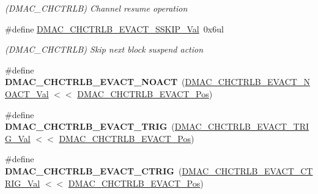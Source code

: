 \begin{DoxyCompactItemize}
\begin{DoxyCompactList}\small\item\em (D\+M\+A\+C\+\_\+\+C\+H\+C\+T\+R\+L\+B) Channel resume operation \end{DoxyCompactList}\item 
\hypertarget{group___s_a_m_l21___d_m_a_c_ga30fe7c169fb72d0ba2f073769858069a}{}\#define \hyperlink{group___s_a_m_l21___d_m_a_c_ga30fe7c169fb72d0ba2f073769858069a}{D\+M\+A\+C\+\_\+\+C\+H\+C\+T\+R\+L\+B\+\_\+\+E\+V\+A\+C\+T\+\_\+\+S\+S\+K\+I\+P\+\_\+\+Val}~0x6ul\label{group___s_a_m_l21___d_m_a_c_ga30fe7c169fb72d0ba2f073769858069a}

\begin{DoxyCompactList}\small\item\em (D\+M\+A\+C\+\_\+\+C\+H\+C\+T\+R\+L\+B) Skip next block suspend action \end{DoxyCompactList}\item 
\hypertarget{group___s_a_m_l21___d_m_a_c_ga71d77ee941fa3622ab00c73f71846f65}{}\#define {\bfseries D\+M\+A\+C\+\_\+\+C\+H\+C\+T\+R\+L\+B\+\_\+\+E\+V\+A\+C\+T\+\_\+\+N\+O\+A\+C\+T}~(\hyperlink{group___s_a_m_l21___d_m_a_c_ga0a82857cf374c8eb7754e671c886dcac}{D\+M\+A\+C\+\_\+\+C\+H\+C\+T\+R\+L\+B\+\_\+\+E\+V\+A\+C\+T\+\_\+\+N\+O\+A\+C\+T\+\_\+\+Val}  $<$$<$ \hyperlink{group___s_a_m_l21___d_m_a_c_ga5d582eee4f8e2bfd97709b103da6830e}{D\+M\+A\+C\+\_\+\+C\+H\+C\+T\+R\+L\+B\+\_\+\+E\+V\+A\+C\+T\+\_\+\+Pos})\label{group___s_a_m_l21___d_m_a_c_ga71d77ee941fa3622ab00c73f71846f65}

\item 
\hypertarget{group___s_a_m_l21___d_m_a_c_gad57584fbe4da10d355cdea4acc6cfec6}{}\#define {\bfseries D\+M\+A\+C\+\_\+\+C\+H\+C\+T\+R\+L\+B\+\_\+\+E\+V\+A\+C\+T\+\_\+\+T\+R\+I\+G}~(\hyperlink{group___s_a_m_l21___d_m_a_c_ga069ed2b2546fdd8706fe1eedcb1674d2}{D\+M\+A\+C\+\_\+\+C\+H\+C\+T\+R\+L\+B\+\_\+\+E\+V\+A\+C\+T\+\_\+\+T\+R\+I\+G\+\_\+\+Val}   $<$$<$ \hyperlink{group___s_a_m_l21___d_m_a_c_ga5d582eee4f8e2bfd97709b103da6830e}{D\+M\+A\+C\+\_\+\+C\+H\+C\+T\+R\+L\+B\+\_\+\+E\+V\+A\+C\+T\+\_\+\+Pos})\label{group___s_a_m_l21___d_m_a_c_gad57584fbe4da10d355cdea4acc6cfec6}

\item 
\hypertarget{group___s_a_m_l21___d_m_a_c_ga13f2fdfac3a5fd93284fcf317ae90e6b}{}\#define {\bfseries D\+M\+A\+C\+\_\+\+C\+H\+C\+T\+R\+L\+B\+\_\+\+E\+V\+A\+C\+T\+\_\+\+C\+T\+R\+I\+G}~(\hyperlink{group___s_a_m_l21___d_m_a_c_ga4cf090f0ab1ac7d1231fb79627925227}{D\+M\+A\+C\+\_\+\+C\+H\+C\+T\+R\+L\+B\+\_\+\+E\+V\+A\+C\+T\+\_\+\+C\+T\+R\+I\+G\+\_\+\+Val}  $<$$<$ \hyperlink{group___s_a_m_l21___d_m_a_c_ga5d582eee4f8e2bfd97709b103da6830e}{D\+M\+A\+C\+\_\+\+C\+H\+C\+T\+R\+L\+B\+\_\+\+E\+V\+A\+C\+T\+\_\+\+Pos})\label{group___s_a_m_l21___d_m_a_c_ga13f2fdfac3a5fd93284fcf317ae90e6b}


\end{DoxyCompactItemize}
